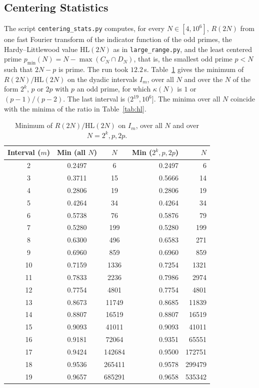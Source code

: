 \documentclass[11pt]{amsart}
\theoremstyle{definition}
\theoremstyle{remark}
\begin{document}
\subsection{Centering Statistics}\label{subsec:centering-stats}
The script \texttt{centering\_stats.py} computes, for every $N\in[4,10^6]$, $R(2N)$ from one fast Fourier transform of the indicator function of the odd primes, the Hardy--Littlewood value $\mathrm{HL}(2N)$ as in \texttt{large\_range.py}, and the least centered prime $p_{\min}(N)=N-\max(C_N\cap D_N)$, that is, the smallest odd prime $p<N$ such that $2N-p$ is prime. The run took $12.2$\,s. Table~\ref{tab:family} gives the minimum of $R(2N)/\mathrm{HL}(2N)$ on the dyadic intervals $I_m$, over all $N$ and over the $N$ of the form $2^k$, $p$ or $2p$ with $p$ an odd prime, for which $\kappa(N)$ is $1$ or $(p-1)/(p-2)$. The last interval is $(2^{19},10^6]$. The minima over all $N$ coincide with the minima of the ratio in Table~\ref{tab:hl}.
\begin{table}[H]
\caption{Minimum of $R(2N)/\mathrm{HL}(2N)$ on $I_m$, over all $N$ and over $N=2^k,p,2p$.}
\label{tab:family}
\small
\begin{tabularx}{\textwidth}{cccrr}
\hline
\textbf{Interval ($m$)} & \textbf{Min (all $N$)} & \textbf{$N$} & \textbf{Min ($2^k,p,2p$)} & \textbf{$N$} \\
\hline
2 & 0.2497 & 6 & 0.2497 & 6 \\
3 & 0.3711 & 15 & 0.5666 & 14 \\
4 & 0.2806 & 19 & 0.2806 & 19 \\
5 & 0.4264 & 34 & 0.4264 & 34 \\
6 & 0.5738 & 76 & 0.5876 & 79 \\
7 & 0.5280 & 199 & 0.5280 & 199 \\
8 & 0.6300 & 496 & 0.6583 & 271 \\
9 & 0.6960 & 859 & 0.6960 & 859 \\
10 & 0.7159 & 1336 & 0.7254 & 1321 \\
11 & 0.7833 & 2236 & 0.7986 & 2974 \\
12 & 0.7754 & 4801 & 0.7754 & 4801 \\
13 & 0.8673 & 11749 & 0.8685 & 11839 \\
14 & 0.8807 & 16519 & 0.8807 & 16519 \\
15 & 0.9093 & 41011 & 0.9093 & 41011 \\
16 & 0.9181 & 72064 & 0.9351 & 65551 \\
17 & 0.9424 & 142684 & 0.9500 & 172751 \\
18 & 0.9536 & 265411 & 0.9578 & 299479 \\
19 & 0.9657 & 685291 & 0.9658 & 535342 \\
\hline
\end{tabularx}
\end{table}
\end{document}
